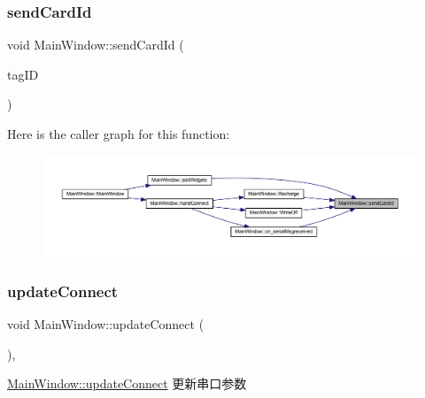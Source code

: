 \subsubsection{\texorpdfstring{sendCardId}{sendCardId}}
{\footnotesize\ttfamily void Main\+Window\+::send\+Card\+Id (\begin{DoxyParamCaption}\item[{Q\+String}]{tag\+ID }\end{DoxyParamCaption})\hspace{0.3cm}{\ttfamily [signal]}}

Here is the caller graph for this function\+:
\nopagebreak
\begin{figure}[H]
\begin{center}
\leavevmode
\includegraphics[width=350pt]{class_main_window_acd99802d86721ec111aa989a80b96ae3_icgraph}
\end{center}
\end{figure}
\mbox{\label{class_main_window_a7fddd1ab5d3fcf4454ef1fdfd45f56a7}} 
\subsubsection{\texorpdfstring{updateConnect}{updateConnect}}
{\footnotesize\ttfamily void Main\+Window\+::update\+Connect (\begin{DoxyParamCaption}{ }\end{DoxyParamCaption})\hspace{0.3cm}{\ttfamily [private]}, {\ttfamily [slot]}}



\mbox{\hyperlink{class_main_window_a7fddd1ab5d3fcf4454ef1fdfd45f56a7}{Main\+Window\+::update\+Connect}} 更新串口参数 

